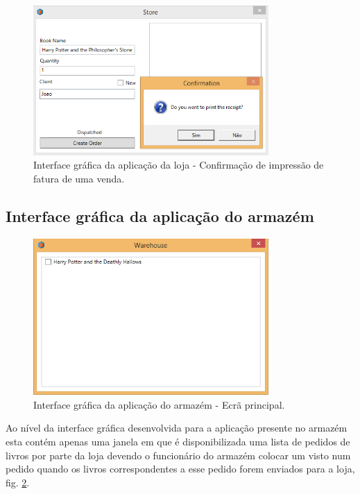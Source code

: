\documentclass[12pt]{article}
\begin{document}
\begin{figure}[H]
    \centering
    \includegraphics[width=0.8\textwidth]{Store_GUI_Receipt_Confirmation_Dialog.png}
    \caption{Interface gráfica da aplicação da loja - Confirmação de impressão de fatura de uma venda.}
    \label{fig:c4}
\end{figure}

\subsection{Interface gráfica da aplicação do armazém}

\begin{figure}[H]
    \centering
    \includegraphics[width=0.8\textwidth]{Warehouse_GUI_Main.png}
    \caption{Interface gráfica da aplicação do armazém - Ecrã principal.}
    \label{fig:c5}
\end{figure}

Ao nível da interface gráfica desenvolvida para a aplicação presente no armazém esta contém apenas uma janela em que é disponibilizada uma lista de pedidos de livros por parte da loja devendo o funcionário do armazém colocar um visto num pedido quando os livros correspondentes a esse pedido forem enviados para a loja, fig. \ref{fig:c5}.
\end{document}
